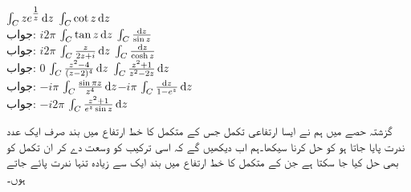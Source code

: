 \quad
$\int_C ze^{\tfrac{1}{z}}\dif z$
\quad
$\int_C \cot z\dif z$\\
جواب:\quad
$i2\pi$
\quad
$\int_C \tan z\dif z$
\quad
$\int_C \tfrac{\dif z}{\sin z}$\\
جواب:\quad
$i2\pi$
\quad
$\int_C \tfrac{z}{2z+i}\dif z$
\quad
$\int_C \tfrac{\dif z}{\cosh z}$\\
جواب:\quad
$0$
\quad
$\int_C \tfrac{z^2-4}{(z-2)^4}\dif z$
\quad
$\int_C \tfrac{z^2+1}{z^2-2z}\dif z$\\
جواب:\quad
$-i\pi$
\quad
$\int_C \tfrac{\sin \pi z}{z^4}\dif z$$-i\pi$
\quad
$\int_C \tfrac{\dif z}{1-e^z}\dif z$\\
جواب:\quad
$-i2\pi$
\quad
$\int_C \tfrac{z^2+1}{e^z\sin z}\dif z$

گزشتہ حصے میں ہم نے ایسا ارتفاعی تکمل جس کے متکمل کا خط ارتفاع میں بند صرف ایک عدد ندرت پایا جاتا ہو کو حل کرنا سیکھا۔ہم اب دیکھیں گے کہ اسی ترکیب کو وسعت دے کر ان تکمل کو بھی حل کیا جا سکتا ہے جن کے متکمل کا خط ارتفاع میں بند  ایک سے زیادہ تنہا ندرت پائے جاتے ہوں۔

